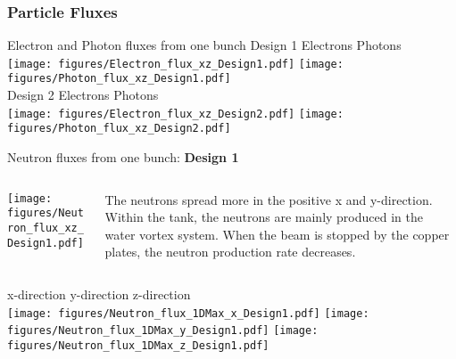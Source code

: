 \documentclass[xcolor={dvipsnames}]{beamer}
\begin{document}
\subsubsection{Particle Fluxes}

\begin{frame}{Electron and Photon fluxes from one bunch}
\centering
Design 1 \hspace*{1.4cm} Electrons \hfill Photons \hspace*{3.1cm} \\
 \texttt{[image: figures/Electron\_flux\_xz\_Design1.pdf]}
  \texttt{[image: figures/Photon\_flux\_xz\_Design1.pdf]}\\
Design 2 \hspace*{1.4cm} Electrons \hfill Photons \hspace*{3.1cm} \\ 
\texttt{[image: figures/Electron\_flux\_xz\_Design2.pdf]}
  \texttt{[image: figures/Photon\_flux\_xz\_Design2.pdf]}
\end{frame}
\begin{frame}{Neutron fluxes from one bunch: \textbf{Design 1}}
\begin{columns}
 \begin{column}{0.5\textwidth}
    \texttt{[image: figures/Neutron\_flux\_xz\_Design1.pdf]}
 \end{column}
 \begin{column}{0.5\textwidth}
  The neutrons spread more in the positive x and y-direction. Within the tank, the neutrons are mainly produced in the water vortex system. When the beam is stopped by the copper plates, the neutron production rate decreases.
 \end{column}
\end{columns}
  \centering
\hspace*{1cm} x-direction \hfill y-direction \hfill z-direction \hspace*{1cm} \\
  \texttt{[image: figures/Neutron\_flux\_1DMax\_x\_Design1.pdf]}\hfill
  \texttt{[image: figures/Neutron\_flux\_1DMax\_y\_Design1.pdf]}\hfill
  \texttt{[image: figures/Neutron\_flux\_1DMax\_z\_Design1.pdf]}
\end{frame}
\end{document}

